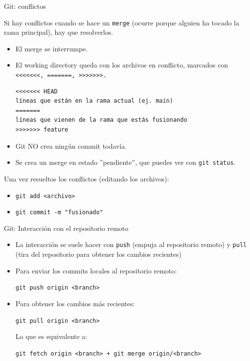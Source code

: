 \documentclass{beamer}
\begin{document}
\begin{frame}[fragile]{Git: conflictos}


Si hay conflictos cuando se hace un \texttt{merge} (ocurre porque alguien ha tocado la rama principal), hay que resolverlos. 

\begin{itemize}
    \item El merge se interrumpe.

    \item El working directory queda con los archivos en conflicto, marcados con \texttt{<<<<<<<, =======, >>>>>>>.}

    \begin{verbatim}
<<<<<<< HEAD
líneas que están en la rama actual (ej. main)
=======
líneas que vienen de la rama que estás fusionando
>>>>>>> feature
\end{verbatim}

\item Git NO crea ningún commit todavía.

\item Se crea un merge en estado ''pendiente'', que puedes ver con \texttt{git status}.
\end{itemize}

\pause

Una vez resueltos los conflictos (editando los archivos):

\begin{itemize}
    \item \texttt{git add <archivo>}
    \item \texttt{git commit -m "fusionado"}
\end{itemize}

    
\end{frame}

\begin{frame}{Git: Interacción con el repositorio remoto}

\begin{itemize}
    \item La interacción se suele hacer con \texttt{push} (empuja al repositorio remoto) y \texttt{pull} (tira del repositorio para obtener los cambios recientes)
    
    \item Para enviar los commits locales al repositorio remoto:

    \texttt{git push origin <branch>}

    \item Para obtener los cambios más recientes:

    \texttt{git pull origin <branch>}

    Lo que es equivalente a:

    \texttt{git fetch origin <branch> + git merge origin/<branch>}
    
\end{itemize}
    
\end{frame}
\end{document}
